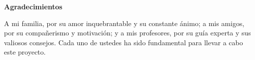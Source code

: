 \documentclass[11pt,a4paper,titlepage,oneside]{report}
\begin{document}

 

\newpage %
\thispagestyle{empty} %

\vspace*{\fill} %
\begin{center} %
\textbf{Agradecimientos} %

\vspace{1em} %

A mi familia, por su amor inquebrantable y su constante ánimo; a mis amigos, por su
compañerismo y motivación; y a mis profesores, por su guía experta y sus valiosos consejos.
Cada uno de ustedes ha sido fundamental para llevar a cabo este proyecto.
\end{center} %
\vspace*{\fill} %
\newpage %


 

 \setcounter{page}{1}


\renewcommand{\lstlistingname}{Listado}

 \tableofcontents
 \listoffigures
 \listoftables
 \lstlistoflistings  %
 \clearpage
 
 \setcounter{page}{1}

 
 
 
 
 
 
 
 


 \appendix
 \appendixpage
 
%

 \printglossary[type=\acronymtype,title=\nomeglosarioacronimos]
 \printglossary[title=\nomeglosariotermos]

 
 
 \clearpage
 
\end{document}
